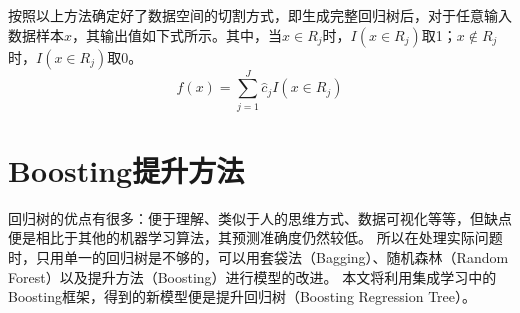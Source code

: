 按照以上方法确定好了数据空间的切割方式，即生成完整回归树后，对于任意输入数据样本$x$，其输出值如下式所示。其中，当$x\in R_j$时，$I(x\in R_j)$取1；$x\notin R_j$时，$I(x\in R_j)$取0。
$$
f(x) = \sum_{j=1}^{J} \hat{c}_j I(x\in R_j)
$$
%
%


\section{Boosting提升方法}
回归树的优点有很多：便于理解、类似于人的思维方式、数据可视化等等，但缺点便是相比于其他的机器学习算法，其预测准确度仍然较低。
所以在处理实际问题时，只用单一的回归树是不够的，可以用套袋法（Bagging）、随机森林（Random Forest）以及提升方法（Boosting）进行模型的改进。
本文将利用集成学习中的Boosting框架，得到的新模型便是提升回归树（Boosting Regression Tree）。

